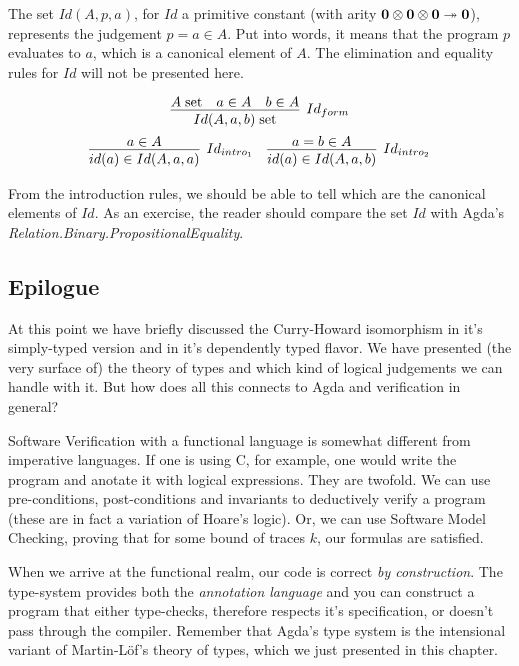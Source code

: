 The set $Id(A, p, a)$, for $Id$ a primitive constant (with arity $\textbf{0} \otimes \textbf{0} \otimes \textbf{0} \twoheadrightarrow \textbf{0}$),
represents the judgement $p = a \in A$. Put into words, it means that the program $p$ evaluates to $a$,
which is a canonical element of $A$. The elimination and equality rules for $Id$ will not be presented here.

\[
  \infer[Id_{form}]
        {\isset{Id(A, a, b)}}
        { \isset{A}
        & a \in A
        & b \in A
        }
\]
\[
\begin{array}{c c}
  \infer[Id_{intro_1}]
        {id(a) \in Id(A, a, a)}
        {a \in A}
&
  \infer[Id_{intro_2}]
        {id(a) \in Id(A, a, b)}
        {a = b \in A}
\end{array}
\]

From the introduction rules, we should be able to tell which are the canonical elements of $Id$.
As an exercise, the reader should compare the set $Id$ with Agda's \emph{Relation.Binary.PropositionalEquality}.

\subsection{Epilogue}

At this point we have briefly discussed the Curry-Howard isomorphism in it's simply-typed
version and in it's dependently typed flavor. We have presented (the very surface of) the theory
of types and which kind of logical judgements we can handle with it. But how does all this connects 
to Agda and verification in general?

Software Verification with a functional language is somewhat different from imperative languages. 
If one is using C, for example, one would write the program and anotate it with logical expressions.
They are twofold. We can use pre-conditions, post-conditions and invariants to deductively verify a program
(these are in fact a variation of Hoare's logic). Or, we can use Software Model Checking, proving
that for some bound of traces $k$, our formulas are satisfied.

When we arrive at the functional realm, our code is correct \emph{by construction}. The type-system
provides both the \emph{annotation language} and you can construct a program that either type-checks,
therefore respects it's specification, or doesn't pass through the compiler. Remember that Agda's
type system is the intensional variant of Martin-L\"{o}f's theory of types, which we just presented
in this chapter.

